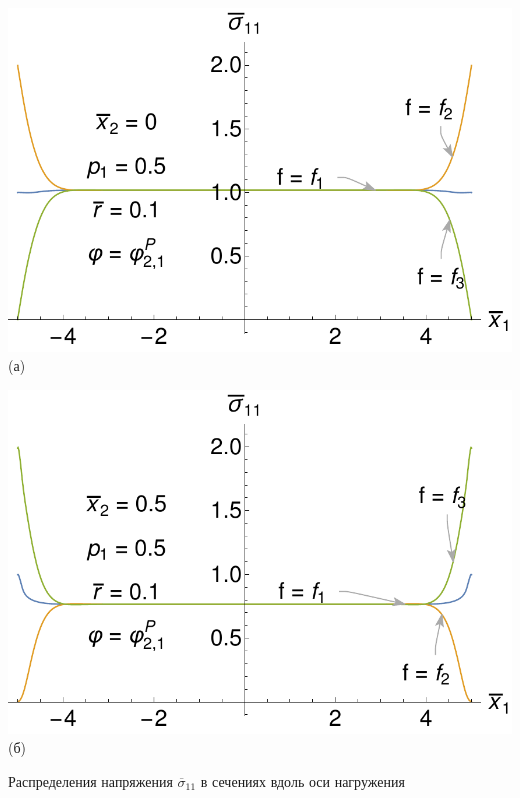 \begin{frame}
	\centering
	\begin{minipage}{0.4\textwidth}
		\centering
		\includegraphics[width=\textwidth]{pics/SaintVenantX0P05Presentation.pdf} \\
		(а)
	\end{minipage}
	\begin{minipage}{0.4\textwidth}
		\centering
		\includegraphics[width=\textwidth]{pics/SaintVenantX05P05Presentation.pdf} \\
		(б)
	\end{minipage}
	
	Распределения напряжения $\overline{\sigma}_{11}$ в сечениях вдоль оси нагружения
	

\end{frame}
